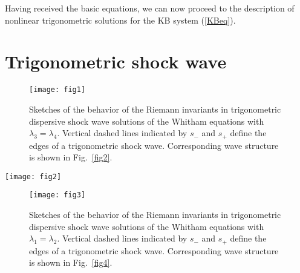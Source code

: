 \documentclass[pre,aps,superscriptaddress,twocolumn,floatfix]{revtex4-1}
\newcommand{\la}{\lambda}
\begin{document}
Having received the basic equations, we can now proceed to the description
of nonlinear trigonometric solutions for the KB system (\ref{KBeq}).


\section{Trigonometric shock wave}\label{sec.TSW}

\begin{figure}[t]
	\begin{center}
\texttt{[image: fig1]}
		\caption{Sketches of the behavior of the Riemann invariants
			in trigonometric dispersive shock wave solutions of the Whitham
			equations with $\la_3=\la_4$. Vertical dashed lines indicated by $s_-$ and $s_+$ define the edges of a trigonometric shock wave. Corresponding wave structure is shown
in Fig.~\ref{fig2}.}
		\label{fig1}
	\end{center}
\end{figure}

\begin{figure*}[t]
	\begin{center}
		\texttt{[image: fig2]}
		\caption{Evolution of a trigonometric shock wave for $h_L=0.3$,
$u_L=0$ and $\lambda_3^R=\lambda_4^R=0.85$. Figures show the initial state
(left column) and wave profiles for depth $h$ and flow velocity $u$ for $t=100$
(middle column) and $t=200$ (right column). Red (thick) curves show the result
of numerical calculations, and a blue (thin) one shows the analytical solution.
Dashed lines illustrate envelopes of wave structure, vertical dashed lines indicate
the edges of the trigonometric shock wave ($x_-$ and $x_+$). We have here dark
solitons of elevation $h$ and bright solitons of flow velocity $u$ at the soliton edge of
the shock. The corresponding diagram of Riemann invariants is shown in Fig.~\ref{fig1}. }
		\label{fig2}
	\end{center}
\end{figure*}

\begin{figure}[t]
	\begin{center}
		\texttt{[image: fig3]}
		\caption{Sketches of the behavior of the Riemann invariants
			in trigonometric dispersive shock wave solutions of the Whitham
			equations with $\la_1=\la_2$. Vertical dashed lines indicated by $s_-$ and $s_+$ define the edges of a trigonometric shock wave. Corresponding wave structure
is shown in Fig.~\ref{fig4}.}
		\label{fig3}
	\end{center}
\end{figure}
\end{document}
